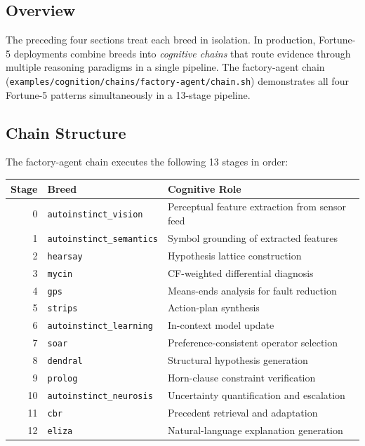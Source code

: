 \subsection{Overview}
\label{subsec:factory-agent-overview}

The preceding four sections treat each breed in isolation. In production, Fortune-5
deployments combine breeds into \emph{cognitive chains} that route evidence through
multiple reasoning paradigms in a single pipeline. The factory-agent chain
(\texttt{examples/cognition/chains/factory-agent/chain.sh}) demonstrates all four
Fortune-5 patterns simultaneously in a 13-stage pipeline.

\subsection{Chain Structure}
\label{subsec:factory-chain-structure}

The factory-agent chain executes the following 13 stages in order:

\medskip
\begin{center}
\begin{tabular}{rll}
\toprule
\textbf{Stage} & \textbf{Breed} & \textbf{Cognitive Role} \\
\midrule
0 & \texttt{autoinstinct\_vision}    & Perceptual feature extraction from sensor feed \\
1 & \texttt{autoinstinct\_semantics} & Symbol grounding of extracted features \\
2 & \texttt{hearsay}                 & Hypothesis lattice construction \\
3 & \texttt{mycin}                   & CF-weighted differential diagnosis \\
4 & \texttt{gps}                     & Means-ends analysis for fault reduction \\
5 & \texttt{strips}                  & Action-plan synthesis \\
6 & \texttt{autoinstinct\_learning}  & In-context model update \\
7 & \texttt{soar}                    & Preference-consistent operator selection \\
8 & \texttt{dendral}                 & Structural hypothesis generation \\
9 & \texttt{prolog}                  & Horn-clause constraint verification \\
10 & \texttt{autoinstinct\_neurosis} & Uncertainty quantification and escalation \\
11 & \texttt{cbr}                    & Precedent retrieval and adaptation \\
12 & \texttt{eliza}                  & Natural-language explanation generation \\
\bottomrule
\end{tabular}
\end{center}
\medskip

